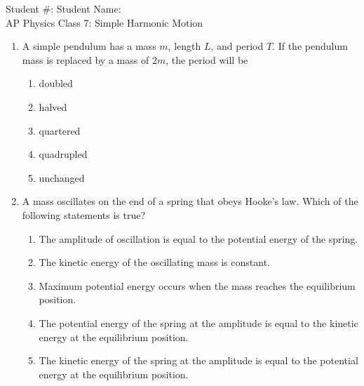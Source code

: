 \documentclass[12pt]{article}
\begin{document}
\begin{center}
  Student \#: \underline{\hspace{1in}}\hspace{1.9in}
  Student Name: \underline{\hspace{2in}}\\
  \vspace{0.3in}
  {\LARGE
    AP Physics \hspace{0.68in} Class 7: Simple Harmonic Motion
  }
\end{center}


\begin{enumerate}[leftmargin=50pt,label=\underline{\hspace{0.4in}} \arabic*.]

\item A simple pendulum has a mass $m$, length $L$, and period $T$. If the
  pendulum mass is replaced by a mass of $2m$, the period will be
  \begin{enumerate}[noitemsep,topsep=0pt]
  \item doubled
  \item halved
  \item quartered
  \item quadrupled
  \item unchanged
  \end{enumerate}

\item A mass oscillates on the end of a spring that obeys Hooke's law. Which of
  the following statements is true?
  \begin{enumerate}[noitemsep,topsep=0pt,leftmargin=18pt]
  \item The amplitude of oscillation is equal to the potential energy of the
    spring.
  \item The kinetic energy of the oscillating mass is constant.
  \item Maximum potential energy occurs when the mass reaches the
    equilibrium position.
  \item The potential energy of the spring at the amplitude is equal to the
    kinetic energy at the equilibrium position.
  \item The kinetic energy of the spring at the amplitude is equal to the
    potential energy at the equilibrium position.
  \end{enumerate}


\end{enumerate}
\end{document}
